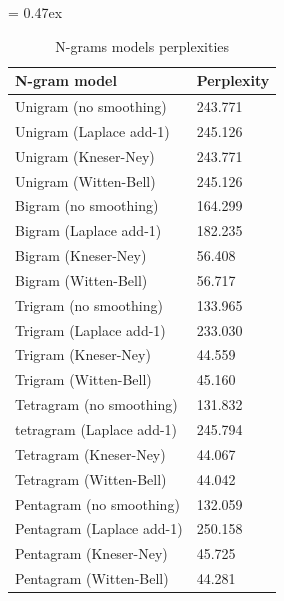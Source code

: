 \begin{table}[t]
	\caption{N-grams models perplexities}
	\extrarowsep = 0.47ex
	\centering
	\begin{tabu} to 0.29\textwidth { X[2.5,m,l] X[m,r] }
		\rowfont{\bfseries\itshape} N-gram model & Perplexity \\
		\hline
		Unigram (no smoothing)		&	243.771		\\
		Unigram (Laplace add-1)		&	245.126		\\
		Unigram (Kneser-Ney)		&	243.771		\\
		Unigram (Witten-Bell)		&	245.126		\\
		Bigram (no smoothing)		&	164.299		\\
		Bigram (Laplace add-1)		&	182.235		\\
		Bigram (Kneser-Ney)			&	 56.408		\\
		Bigram (Witten-Bell)		&	 56.717		\\
		Trigram (no smoothing)		&	133.965		\\
		Trigram (Laplace add-1)		&	233.030		\\
		Trigram (Kneser-Ney)		&	 44.559		\\
		Trigram (Witten-Bell)		&	 45.160		\\
		Tetragram (no smoothing)	&	131.832		\\
		tetragram (Laplace add-1)	&	245.794		\\
		Tetragram (Kneser-Ney)		&	 44.067		\\
		Tetragram (Witten-Bell)		&	 44.042		\\
		Pentagram (no smoothing)	&	132.059		\\
		Pentagram (Laplace add-1)	&	250.158		\\
		Pentagram (Kneser-Ney)		&	 45.725		\\
		Pentagram (Witten-Bell)		&	 44.281		\\
	\end{tabu}
	\label{tab:n-grams-models-perplexities}
\end{table}
